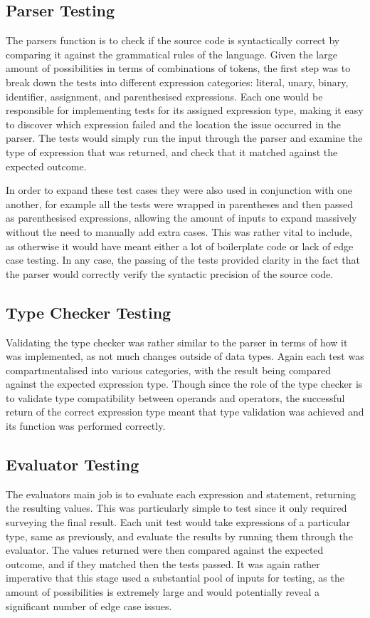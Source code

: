 \documentclass[
]{report}
\begin{document}
\subsection{Parser Testing}
The parsers function is to check if the source code is syntactically
correct by comparing it against the grammatical rules of the language.
Given the large amount of possibilities in terms of combinations of
tokens, the first step was to break down the tests into different
expression categories: literal, unary, binary, identifier, assignment,
and parenthesised expressions. Each one would be responsible for
implementing tests for its assigned expression type, making it easy to
discover which expression failed and the location the issue occurred in
the parser. The tests would simply run the input through the parser and
examine the type of expression that was returned, and check that it
matched against the expected outcome.

In order to expand these test cases they were also used in conjunction
with one another, for example all the tests were wrapped in parentheses
and then passed as parenthesised expressions, allowing the amount of
inputs to expand massively without the need to manually add extra cases.
This was rather vital to include, as otherwise it would have meant
either a lot of boilerplate code or lack of edge case testing. In any
case, the passing of the tests provided clarity in the fact that the
parser would correctly verify the syntactic precision of the source
code.

\subsection{Type Checker Testing}
Validating the type checker was rather similar to the parser in terms of
how it was implemented, as not much changes outside of data types. Again
each test was compartmentalised into various categories, with the result
being compared against the expected expression type. Though since the
role of the type checker is to validate type compatibility between
operands and operators, the successful return of the correct expression
type meant that type validation was achieved and its function was
performed correctly.

\subsection{Evaluator Testing}
The evaluators main job is to evaluate each expression and statement,
returning the resulting values. This was particularly simple to test
since it only required surveying the final result. Each unit test would
take expressions of a particular type, same as previously, and evaluate
the results by running them through the evaluator. The values returned
were then compared against the expected outcome, and if they matched
then the tests passed. It was again rather imperative that this stage
used a substantial pool of inputs for testing, as the amount of
possibilities is extremely large and would potentially reveal a
significant number of edge case issues.
\end{document}
